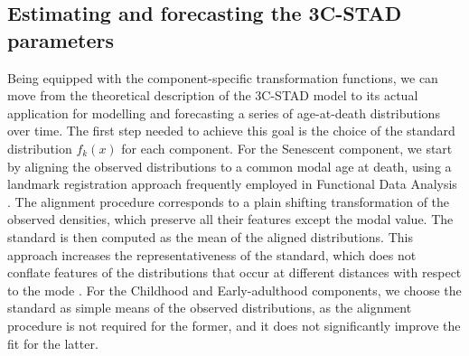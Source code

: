 \documentclass[11pt, a4paper]{article}
\begin{document}

\subsection{Estimating and forecasting the 3C-STAD parameters}\label{Subsec:STADforecast}

Being equipped with the component-specific transformation functions, we can move from the theoretical description of the 3C-STAD model to its actual application for modelling and forecasting a series of age-at-death distributions over time. The first step needed to achieve this goal is the choice of the standard distribution $f_{k}(x)$ for each component. For the Senescent component, we start by aligning the observed distributions to a common modal age at death, using a landmark registration approach frequently employed in Functional Data Analysis \citep{ramsay2005FDA}. The alignment procedure corresponds to a plain shifting transformation of the observed densities, which preserve all their features except the modal value. The standard is then computed as the mean of the aligned distributions. This approach increases the representativeness of the standard, which does not conflate features of the distributions that occur at different distances with respect to the mode \cite[for additional details and an explicative illustration, see][pp.~122--124]{basellini2019stad}. For the Childhood and Early-adulthood components, we choose the standard as simple means of the observed distributions, as the alignment procedure is not required for the former, and it does not significantly improve the fit for the latter. 
\end{document}
